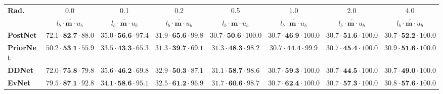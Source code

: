 \begin{tabular}{lccccccc}
\toprule
\textbf{Rad.} & 0.0 & 0.1 &  0.2 & 0.5 & 1.0 & 2.0 & 4.0 \\
                   & $\overline{l_b \cdot \mathrm{\textbf{m}} \cdot u_b}$ & $\overline{l_b \cdot \mathrm{\textbf{m}} \cdot u_b}$ & $\overline{l_b \cdot \mathrm{\textbf{m}} \cdot u_b}$ & $\overline{l_b \cdot \mathrm{\textbf{m}} \cdot u_b}$ & $\overline{l_b \cdot \mathrm{\textbf{m}} \cdot u_b}$ & $\overline{l_b \cdot \mathrm{\textbf{m}} \cdot u_b}$ & $\overline{l_b \cdot \mathrm{\textbf{m}} \cdot u_b}$ \\
\midrule
\textbf{PostNet } & $72.1 \cdot \textbf{82.7} \cdot 88.0$ &  $35.0 \cdot \textbf{56.6} \cdot 97.4$ &  $31.9 \cdot \textbf{65.6} \cdot 99.8$ & $30.7 \cdot \textbf{50.6} \cdot 100.0$ & $30.7 \cdot \textbf{46.9} \cdot 100.0$ &           $30.7 \cdot \textbf{51.6} \cdot 100.0$ &           $30.7 \cdot \textbf{52.2} \cdot 100.0$ \\
\textbf{PriorNet} & $50.2 \cdot \textbf{53.1} \cdot 55.9$ &  $33.5 \cdot \textbf{43.3} \cdot 65.3$ &  $31.3 \cdot \textbf{39.7} \cdot 69.1$ &  $31.3 \cdot \textbf{48.3} \cdot 98.2$ &  $30.7 \cdot \textbf{44.4} \cdot 99.9$ &           $30.7 \cdot \textbf{45.4} \cdot 100.0$ &            $30.9 \cdot \textbf{51.6} \cdot 100.0$ \\
\textbf{DDNet   } & $72.0 \cdot \textbf{75.8} \cdot 79.8$ &  $35.6 \cdot \textbf{46.2} \cdot 69.8$ &  $32.9 \cdot \textbf{50.3} \cdot 87.1$ &  $31.1 \cdot \textbf{58.7} \cdot 98.6$ &  $30.7 \cdot \textbf{59.3} \cdot 100.0$ &           $30.7 \cdot \textbf{44.5} \cdot 100.0$ &           $30.7 \cdot \textbf{49.0} \cdot 100.0$ \\
\textbf{EvNet   } &  $79.5 \cdot \textbf{87.1} \cdot 92.8$ &  $34.1 \cdot \textbf{58.6} \cdot 95.1$ & $32.5 \cdot \textbf{61.2} \cdot 96.9$ &  $31.7 \cdot \textbf{60.6} \cdot 98.7$ &  $30.7 \cdot \textbf{62.4} \cdot 100.0$ &           $30.7 \cdot \textbf{57.3} \cdot 100.0$ &           $30.8 \cdot \textbf{57.6} \cdot 100.0$ \\
\bottomrule
\end{tabular}